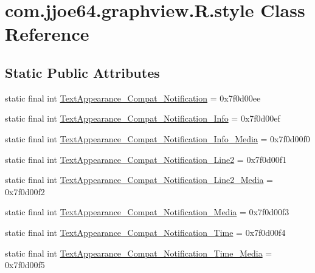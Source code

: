 \hypertarget{classcom_1_1jjoe64_1_1graphview_1_1_r_1_1style}{}\section{com.\+jjoe64.\+graphview.\+R.\+style Class Reference}
\label{classcom_1_1jjoe64_1_1graphview_1_1_r_1_1style}
\subsection*{Static Public Attributes}
\begin{DoxyCompactItemize}
\item 
static final int \mbox{\hyperlink{classcom_1_1jjoe64_1_1graphview_1_1_r_1_1style_a5ab9813003a087596faa004fc51f6328}{Text\+Appearance\+\_\+\+Compat\+\_\+\+Notification}} = 0x7f0d00ee
\item 
static final int \mbox{\hyperlink{classcom_1_1jjoe64_1_1graphview_1_1_r_1_1style_a4b7cf6cff1cb96a3767c37848c5cd232}{Text\+Appearance\+\_\+\+Compat\+\_\+\+Notification\+\_\+\+Info}} = 0x7f0d00ef
\item 
static final int \mbox{\hyperlink{classcom_1_1jjoe64_1_1graphview_1_1_r_1_1style_a3bb6f9c9f99c4529d5d327df3504cf79}{Text\+Appearance\+\_\+\+Compat\+\_\+\+Notification\+\_\+\+Info\+\_\+\+Media}} = 0x7f0d00f0
\item 
static final int \mbox{\hyperlink{classcom_1_1jjoe64_1_1graphview_1_1_r_1_1style_a082d0ca86e56d390d47b7d3a09767130}{Text\+Appearance\+\_\+\+Compat\+\_\+\+Notification\+\_\+\+Line2}} = 0x7f0d00f1
\item 
static final int \mbox{\hyperlink{classcom_1_1jjoe64_1_1graphview_1_1_r_1_1style_a69ed40ae10c02a9f23d07384bfa09997}{Text\+Appearance\+\_\+\+Compat\+\_\+\+Notification\+\_\+\+Line2\+\_\+\+Media}} = 0x7f0d00f2
\item 
static final int \mbox{\hyperlink{classcom_1_1jjoe64_1_1graphview_1_1_r_1_1style_ade19a908ff2a3b106fa42fbe18b2d2f1}{Text\+Appearance\+\_\+\+Compat\+\_\+\+Notification\+\_\+\+Media}} = 0x7f0d00f3
\item 
static final int \mbox{\hyperlink{classcom_1_1jjoe64_1_1graphview_1_1_r_1_1style_a4813e27022643572b272bcfbe243e673}{Text\+Appearance\+\_\+\+Compat\+\_\+\+Notification\+\_\+\+Time}} = 0x7f0d00f4
\item 
static final int \mbox{\hyperlink{classcom_1_1jjoe64_1_1graphview_1_1_r_1_1style_a1ffa359cef93a1341f7c4af0b6d1a37b}{Text\+Appearance\+\_\+\+Compat\+\_\+\+Notification\+\_\+\+Time\+\_\+\+Media}} = 0x7f0d00f5

\end{DoxyCompactItemize}
